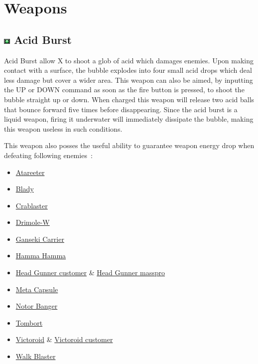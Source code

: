 \section{Weapons}\label{X3:sub_weapon}
\subsection{\includegraphics[width=12px, height=10px]{figures/X3/weapons/A_burst.jpg} Acid Burst}\label{Acid_Burst}
Acid Burst allow X to shoot a glob of acid which damages enemies. Upon making contact with a surface, the bubble explodes into four small acid drops which deal less damage but cover a wider area. This weapon can also be aimed, by inputting the UP or DOWN command as soon as the fire button is pressed, to shoot the bubble straight up or down. When charged this weapon will release two acid balls that bounce forward five times before disappearing. Since the acid burst is a liquid weapon, firing it underwater will immediately dissipate the bubble, making this weapon useless in such conditions. 

This weapon also posses the useful ability to guarantee weapon energy drop when defeating following enemies~\cite{X3:enem_drop_gfaqs}:
\begin{itemize}
	\item \hyperlink{enem:Atareeter}{Atareeter}
	\item \hyperlink{enem:Blady}{Blady}
	\item \hyperlink{enem:Crablaster}{Crablaster}
	\item \hyperlink{enem:Drimole-W}{Drimole-W }
	\item \hyperlink{enem:Ganseki_Carrier}{Ganseki Carrier}
	\item \hyperlink{enem:Hamma_Hamma}{Hamma Hamma}
	\item \hyperlink{enem:Head_Gunner_customer}{Head Gunner customer} \& \hyperlink{enem:Head_Gunner_masspro}{Head Gunner masspro}
	\item \hyperlink{enem:Meta_Capsule}{Meta Capsule}
	\item \hyperlink{enem:Notor_Banger}{Notor Banger}
	\item \hyperlink{enem:Tombort}{Tombort}
	\item \hyperlink{enem:Victoroid}{Victoroid} \& \hyperlink{enem:Victoroid_customer}{Victoroid customer}
	\item \hyperlink{enem:Walk Blaster}{Walk Blaster}
\end{itemize}

